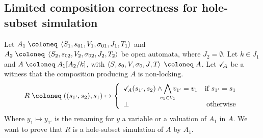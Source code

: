 \documentclass{article}
\begin{document}
\subsection{Limited composition correctness for hole-subset simulation}\label{apx:lchs}
Let \(A_1 \defobject \OAg[1]\) and \(A_2 \defobject \OAg[2]\) be open automata, where \(J_2 = \emptyset\).
Let \(k \in J_1\) and \(A \defobject A_1\subst{A_2}{k}\), with \(\OAg \defobject A\).
Let \(\checkmark_{\!\! A}\) be a witness that the composition producing \(A\) is non-locking.
\[ R \defobject \mpar{\mpar{s_{1'}, s_2}, s_1} \mapsto \choice{\reach{A}\mpar{s_{1'}, s_2} \wedge \bigwedge_\subbox{v_1 \in V_1} v_{1'} = v_1 & \text{if } s_{1'} = s_1 \\ \bot & \text{otherwise}} \]
Where \(y_1 \mapsto y_{1'}\) is the renaming for \(y\) a variable or a valuation of \(A_1\) in \(A\).
We want to prove that \(R\) is a hole-subset simulation of \(A\) by \(A_1\).
\end{document}
